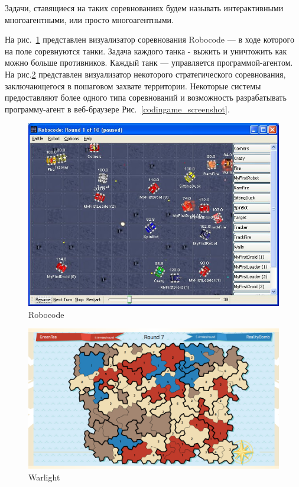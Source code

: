 \documentclass{imcs}
\begin{document}
Задачи, ставящиеся на таких соревнованиях будем называть интерактивными многоагентными, или просто многоагентными.

На рис.~\ref{robocode_screenshot} представлен визуализатор соревнования Robocode — в ходе которого на поле соревнуются танки. Задача каждого танка - выжить и уничтожить как можно больше противников. Каждый танк — управляется программой-агентом. На рис.\ref{warlight_screenshot} представлен визуализатор некоторого стратегического соревнования, заключающегося в пошаговом захвате территории. Некоторые системы предоставляют более одного типа соревнований и возможность разрабатывать программу-агент в веб-браузере Рис.~\ref{codingame_screenshot}.

\begin{figure}[htb]
\centering
\includegraphics[width=\textwidth,keepaspectratio]{./img/robocode.jpg}
\caption{Robocode}
\label{robocode_screenshot}
\end{figure}

\begin{figure}[htb]
\centering
\includegraphics[width=\textwidth,keepaspectratio]{./img/warlight.png}
\caption{Warlight}
\label{warlight_screenshot}
\end{figure}
\end{document}
